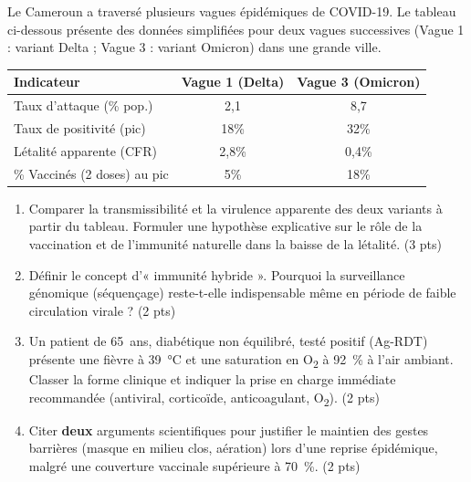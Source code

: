 \documentclass[11pt]{article}
\begin{document}
\begin{exercice}
Le Cameroun a traversé plusieurs vagues épidémiques de COVID-19. Le tableau ci-dessous présente des données simplifiées pour deux vagues successives (Vague 1 : variant Delta ; Vague 3 : variant Omicron) dans une grande ville.
\begin{center}
\begin{tabular}{|l|c|c|}
\hline
\textbf{Indicateur} & \textbf{Vague 1 (Delta)} & \textbf{Vague 3 (Omicron)} \\
\hline
Taux d'attaque (\% pop.) & 2,1 & 8,7 \\
Taux de positivité (pic) & 18\% & 32\% \\
Létalité apparente (CFR) & 2,8\% & 0,4\% \\
\% Vaccinés (2 doses) au pic & 5\% & 18\% \\
\hline
\end{tabular}
\end{center}
\begin{enumerate}
    \item Comparer la transmissibilité et la virulence apparente des deux variants à partir du tableau. Formuler une hypothèse explicative sur le rôle de la vaccination et de l'immunité naturelle dans la baisse de la létalité. (3 pts)
    \item Définir le concept d'« immunité hybride ». Pourquoi la surveillance génomique (séquençage) reste-t-elle indispensable même en période de faible circulation virale ? (2 pts)
    \item Un patient de 65~ans, diabétique non équilibré, testé positif (Ag-RDT) présente une fièvre à \SI{39}{\degreeCelsius} et une saturation en O\textsubscript{2} à \SI{92}{\percent} à l'air ambiant. Classer la forme clinique et indiquer la prise en charge immédiate recommandée (antiviral, corticoïde, anticoagulant, O\textsubscript{2}). (2 pts)
    \item Citer \textbf{deux} arguments scientifiques pour justifier le maintien des gestes barrières (masque en milieu clos, aération) lors d'une reprise épidémique, malgré une couverture vaccinale supérieure à \SI{70}{\percent}. (2 pts)
\end{enumerate}
\end{exercice}
\end{document}
